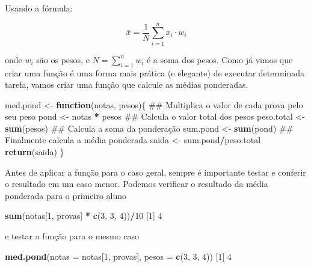\documentclass[10pt,a4paper]{book}
\newenvironment{Shaded}{\begin{snugshade}}{\end{snugshade}}
\newcommand{\KeywordTok}[1]{\textcolor[rgb]{0.13,0.29,0.53}{\textbf{#1}}}
\newcommand{\DataTypeTok}[1]{\textcolor[rgb]{0.13,0.29,0.53}{#1}}
\newcommand{\DecValTok}[1]{\textcolor[rgb]{0.00,0.00,0.81}{#1}}
\newcommand{\StringTok}[1]{\textcolor[rgb]{0.31,0.60,0.02}{#1}}
\newcommand{\ControlFlowTok}[1]{\textcolor[rgb]{0.13,0.29,0.53}{\textbf{#1}}}
\newcommand{\OperatorTok}[1]{\textcolor[rgb]{0.81,0.36,0.00}{\textbf{#1}}}
\newcommand{\NormalTok}[1]{#1}
\begin{document}
Usando a fórmula:

\[
\bar{x} = \frac{1}{N} \sum_{i=1}^{n} x_i \cdot w_i
\]

onde \(w_i\) são os pesos, e \(N = \sum_{i=1}^{n} w_i\) é a soma dos
pesos. Como já vimos que criar uma função é uma forma mais prática (e
elegante) de executar determinada tarefa, vamos criar uma função que
calcule as médias ponderadas.

\begin{Shaded}
\begin{Highlighting}[]
\NormalTok{med.pond <-}\StringTok{ }\ControlFlowTok{function}\NormalTok{(notas, pesos)\{}
\NormalTok{    ## Multiplica o valor de cada prova pelo seu peso}
\NormalTok{    pond <-}\StringTok{ }\NormalTok{notas }\OperatorTok{*}\StringTok{ }\NormalTok{pesos}
\NormalTok{    ## Calcula o valor total dos pesos}
\NormalTok{    peso.total <-}\StringTok{ }\KeywordTok{sum}\NormalTok{(pesos)}
\NormalTok{    ## Calcula a soma da ponderação}
\NormalTok{    sum.pond <-}\StringTok{ }\KeywordTok{sum}\NormalTok{(pond)}
\NormalTok{    ## Finalmente calcula a média ponderada}
\NormalTok{    saida <-}\StringTok{ }\NormalTok{sum.pond}\OperatorTok{/}\NormalTok{peso.total}
    \KeywordTok{return}\NormalTok{(saida)}
\NormalTok{\}}
\end{Highlighting}
\end{Shaded}

Antes de aplicar a função para o caso geral, sempre é importante testar
e conferir o resultado em um caso menor. Podemos verificar o resultado
da média ponderada para o primeiro aluno

\begin{Shaded}
\begin{Highlighting}[]
\KeywordTok{sum}\NormalTok{(notas[}\DecValTok{1}\NormalTok{, provas] }\OperatorTok{*}\StringTok{ }\KeywordTok{c}\NormalTok{(}\DecValTok{3}\NormalTok{, }\DecValTok{3}\NormalTok{, }\DecValTok{4}\NormalTok{))}\OperatorTok{/}\DecValTok{10}
\NormalTok{[}\DecValTok{1}\NormalTok{] }\DecValTok{4}
\end{Highlighting}
\end{Shaded}

e testar a função para o mesmo caso

\begin{Shaded}
\begin{Highlighting}[]
\KeywordTok{med.pond}\NormalTok{(}\DataTypeTok{notas =}\NormalTok{ notas[}\DecValTok{1}\NormalTok{, provas], }\DataTypeTok{pesos =} \KeywordTok{c}\NormalTok{(}\DecValTok{3}\NormalTok{, }\DecValTok{3}\NormalTok{, }\DecValTok{4}\NormalTok{))}
\NormalTok{[}\DecValTok{1}\NormalTok{] }\DecValTok{4}
\end{Highlighting}
\end{Shaded}
\end{document}
